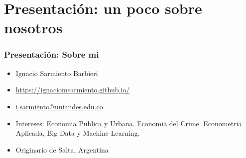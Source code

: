 \documentclass[
  shownotes,
  xcolor={svgnames},
  hyperref={colorlinks,citecolor=DarkBlue,linkcolor=DarkRed,urlcolor=DarkBlue}
  ]{beamer}
\begin{document}

\section{Presentación: un poco sobre nosotros}
\begin{frame}
\frametitle{Presentación: Sobre mi}

  \begin{itemize}
      \item  Ignacio Sarmiento Barbieri
      \medskip
      \item \url{https://ignaciomsarmiento.github.io/}
      \medskip
      \item \href{mailto:i.sarmiento@uniandes.edu.co}{i.sarmiento@uniandes.edu.co}
      \medskip
      \item Intereses: Economia Publica y Urbana. Economia del Crime. Econometria Aplicada, Big Data y Machine Learning.
      \medskip
      \item Originario de Salta, Argentina
  \end{itemize}

\end{frame}
\end{document}
